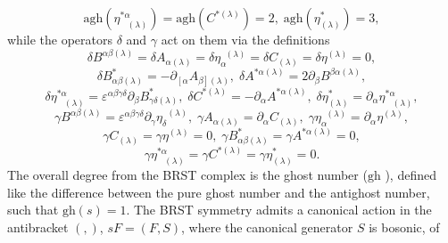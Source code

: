 \documentclass[a4paper,12pt]{article}
\begin{document}
\begin{equation}
\mathrm{agh}\left( \eta _{\;\;\;(\lambda )}^{*\alpha }\right) =\mathrm{agh}%
\left( C^{*(\lambda )}\right) =2,\;\mathrm{agh}\left( \eta _{(\lambda
)}^{*}\right) =3,  \label{cin9}
\end{equation}
while the operators $\delta $ and $\gamma $ act on them via the definitions
\begin{equation}
\delta B^{\alpha \beta (\lambda )}=\delta A_{\alpha (\lambda )}=\delta \eta
_{\alpha }^{\;\;(\lambda )}=\delta C_{(\lambda )}=\delta \eta ^{(\lambda
)}=0,  \label{cin10}
\end{equation}
\begin{equation}
\delta B_{\alpha \beta (\lambda )}^{*}=-\partial _{\left[ \alpha \right.
}A_{\left. \beta \right] (\lambda )},\;\delta A^{*\alpha (\lambda
)}=2\partial _{\beta }B^{\beta \alpha (\lambda )},  \label{cin11}
\end{equation}
\begin{equation}
\delta \eta _{\;\;\;(\lambda )}^{*\alpha }=\varepsilon ^{\alpha \beta \gamma
\delta }\partial _{\beta }B_{\gamma \delta (\lambda )}^{*},\;\delta
C^{*(\lambda )}=-\partial _{\alpha }A^{*\alpha (\lambda )},\;\delta \eta
_{(\lambda )}^{*}=\partial _{\alpha }\eta _{\;\;\;(\lambda )}^{*\alpha },
\label{cin12}
\end{equation}
\begin{equation}
\gamma B^{\alpha \beta (\lambda )}=\varepsilon ^{\alpha \beta \gamma \delta
}\partial _{\gamma }\eta _{\delta }^{\;\;(\lambda )},\;\gamma A_{\alpha
(\lambda )}=\partial _{\alpha }C_{(\lambda )},\;\gamma \eta _{\alpha
}^{\;\;(\lambda )}=\partial _{\alpha }\eta ^{(\lambda )},  \label{cin13}
\end{equation}
\begin{equation}
\gamma C_{(\lambda )}=\gamma \eta ^{(\lambda )}=0,\;\gamma B_{\alpha \beta
(\lambda )}^{*}=\gamma A^{*\alpha (\lambda )}=0,  \label{cin14}
\end{equation}
\begin{equation}
\gamma \eta _{\;\;\;(\lambda )}^{*\alpha }=\gamma C^{*(\lambda )}=\gamma
\eta _{(\lambda )}^{*}=0.  \label{cin15}
\end{equation}
The overall degree from the BRST complex is the ghost number ($\mathrm{gh}$%
), defined like the difference between the pure ghost number and the
antighost number, such that $\mathrm{gh}\left( s\right) =1$. The BRST
symmetry admits a canonical action in the antibracket $\left( ,\right) $, $%
sF=\left( F,S\right) $, where the canonical generator $S$ is bosonic, of
\end{document}
